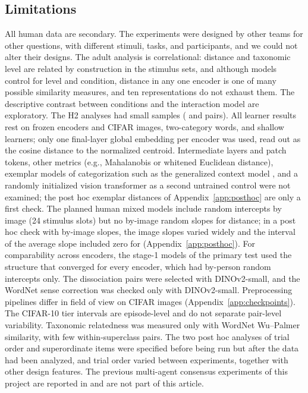 \documentclass[11pt]{article}
\begin{document}
\subsection{Limitations}

All human data are secondary. The experiments were designed by other teams for other questions, with different stimuli, tasks, and participants, and we could not alter their designs. The adult analysis is correlational: distance and taxonomic level are related by construction in the stimulus sets, and although models control for level and condition, distance in any one encoder is one of many possible similarity measures, and ten representations do not exhaust them. The descriptive contrast between conditions and the interaction model are exploratory. The H2 analyses had small samples (\HTwoThingsN{} and \HTwoHsjN{} pairs). All learner results rest on frozen encoders and CIFAR images, two-category words, and shallow learners; only one final-layer global embedding per encoder was used, read out as the cosine distance to the normalized centroid. Intermediate layers and patch tokens, other metrics (e.g., Mahalanobis or whitened Euclidean distance), exemplar models of categorization such as the generalized context model \parencite{nosofsky1986}, and a randomly initialized vision transformer as a second untrained control were not examined; the post hoc exemplar distances of Appendix~\ref{app:posthoc} are only a first check. The planned human mixed models include random intercepts by image (24 stimulus slots) but no by-image random slopes for distance; in a post hoc check with by-image slopes, the image slopes varied widely and the interval of the average slope included zero for \VcImgTrInclList{} (Appendix~\ref{app:posthoc}). For comparability across encoders, the stage-1 models of the primary test used the structure that converged for every encoder, which had by-person random intercepts only. The dissociation pairs were selected with DINOv2-small, and the WordNet sense correction was checked only with DINOv2-small. Preprocessing pipelines differ in field of view on CIFAR images (Appendix~\ref{app:checkpoints}). The CIFAR-10 tier intervals are episode-level and do not separate pair-level variability. Taxonomic relatedness was measured only with WordNet Wu--Palmer similarity, with few within-superclass pairs. The two post hoc analyses of trial order and superordinate items were specified before being run but after the data had been analyzed, and trial order varied between experiments, together with other design features. The previous multi-agent consensus experiments of this project are reported in \textcite{vera2026lexical} and are not part of this article.
\end{document}
